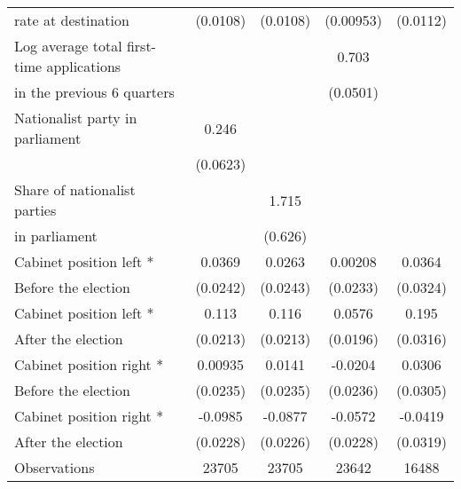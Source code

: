 \begin{table}[htbp]
\begin{tabular}{l*{4}{c}}
 rate at destination                    &    (0.0108)         &    (0.0108)         &   (0.00953)         &    (0.0112)         \\
[0,5em]
Log average total first-time applications &                     &                     &   0.703\sym{***}                   &                     \\
 in the previous 6 quarters                    &                     &                     &     (0.0501)                 &                     \\
[0,5em]
Nationalist party in parliament&       0.246\sym{***}&                     &                     &                     \\
                    &    (0.0623)         &                     &                     &                     \\
[0,5em]
Share of nationalist parties &                     &       1.715\sym{**} &                     &                     \\
in parliament                    &                     &     (0.626)         &                     &                     \\
[0,5em]
Cabinet position left *&      0.0369         &      0.0263         &     0.00208         &      0.0364         \\
 Before the election                    &    (0.0242)         &    (0.0243)         &    (0.0233)         &    (0.0324)         \\
[0,5em]
Cabinet position left * &       0.113\sym{***}&       0.116\sym{***}&      0.0576\sym{**} &       0.195\sym{***}\\
After the election                    &    (0.0213)         &    (0.0213)         &    (0.0196)         &    (0.0316)         \\
[0,5em]
Cabinet position right * &     0.00935         &      0.0141         &     -0.0204         &      0.0306         \\
Before the election                    &    (0.0235)         &    (0.0235)         &    (0.0236)         &    (0.0305)         \\
[0,5em]
Cabinet position right *&     -0.0985\sym{***}&     -0.0877\sym{***}&     -0.0572\sym{*}  &     -0.0419         \\
 After the election                    &    (0.0228)         &    (0.0226)         &    (0.0228)         &    (0.0319)         \\
\hline
Observations        &       23705         &       23705         &       23642         &       16488         \\

\end{tabular}
\end{table}
